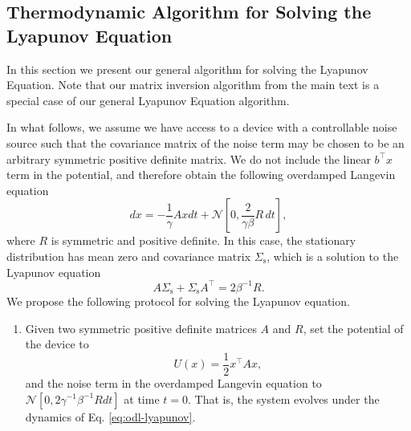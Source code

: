 \documentclass[prx,onecolumn,floatfix,longbibliography,notitlepage, nofootinbib]{revtex4-1}
\begin{document}
\begin{appendix}
\section{Thermodynamic Algorithm for Solving the Lyapunov Equation}

In this section we present our general algorithm for solving the Lyapunov Equation. Note that our matrix inversion algorithm from the main text is a special case of our general Lyapunov Equation algorithm. 

In what follows, we assume we have access to a device with a controllable noise source such that the covariance matrix of the noise term may be chosen to be an arbitrary symmetric positive definite matrix. We do not include the linear $b^\intercal x$ term in the potential, and therefore obtain the following overdamped Langevin equation
\begin{equation}
\label{eq:odl-lyapunov}
    dx = -\frac{1}{\gamma}A x dt + \mathcal{N}\left[0, \frac{2}{\gamma \beta } R\, dt\right],
\end{equation}
where $R$ is symmetric and positive definite.
In this case, the stationary distribution has mean zero and covariance matrix $\Sigma_\text{s}$, which is a solution to the Lyapunov equation
 \begin{equation}\label{eq:Lyapunov}
     A\Sigma_\text{s}+ \Sigma_\text{s} A^{\intercal} = 2\beta^{-1}R.
 \end{equation}
We propose the following protocol for solving the Lyapunov equation.
\medskip
\begin{tcolorbox}[title={Lyapunov Equation Protocol},breakable]
\begin{enumerate}
\item Given two symmetric positive definite matrices $A$ and $R$, set the potential of the device to
\begin{equation}
    U(x) = \frac{1}{2} x^\intercal A x,
\end{equation}
and the noise term in the overdamped Langevin equation to $\mathcal{N}\left[0,2\gamma^{-1}\beta^{-1} R dt\right]$ at time $t=0$. That is, the system evolves under the dynamics of Eq. \eqref{eq:odl-lyapunov}.


\end{enumerate}
\end{tcolorbox}
\end{appendix}
\end{document}

